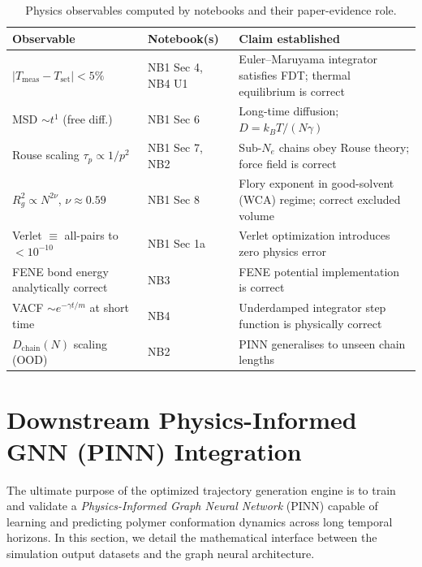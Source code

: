 \documentclass[12pt,a4paper]{article}
\begin{document}
\begin{table}[h]
\centering
\caption{Physics observables computed by notebooks and their paper-evidence role.}
\label{tab:evidence}
\begin{tabular}{p{4cm}p{3.5cm}p{5cm}}
\toprule
Observable & Notebook(s) & Claim established \\
\midrule
$|T_\text{meas} - T_\text{set}| < 5\%$
  & NB1 Sec 4, NB4 U1
  & Euler--Maruyama integrator satisfies FDT; thermal equilibrium is correct \\
MSD $\sim t^1$ (free diff.)
  & NB1 Sec 6
  & Long-time diffusion; $D = k_BT/(N\gamma)$ \\
Rouse scaling $\tau_p \propto 1/p^2$
  & NB1 Sec 7, NB2
  & Sub-$N_e$ chains obey Rouse theory; force field is correct \\
$R_g^2 \propto N^{2\nu}$, $\nu \approx 0.59$
  & NB1 Sec 8
  & Flory exponent in good-solvent (WCA) regime; correct excluded volume \\
Verlet $\equiv$ all-pairs to $<10^{-10}$
  & NB1 Sec 1a
  & Verlet optimization introduces zero physics error \\
FENE bond energy analytically correct
  & NB3
  & FENE potential implementation is correct \\
VACF $\sim e^{-\gamma t/m}$ at short time
  & NB4
  & Underdamped integrator step function is physically correct \\
$D_\text{chain}(N)$ scaling (OOD)
  & NB2
  & PINN generalises to unseen chain lengths \\
\bottomrule
\end{tabular}
\end{table}


\section{Downstream Physics-Informed GNN (PINN) Integration}
\label{sec:pinn}

The ultimate purpose of the optimized trajectory generation engine is to train
and validate a \emph{Physics-Informed Graph Neural Network} (PINN) capable of learning
and predicting polymer conformation dynamics across long temporal horizons.
In this section, we detail the mathematical interface between the simulation
output datasets and the graph neural architecture.
\end{document}
